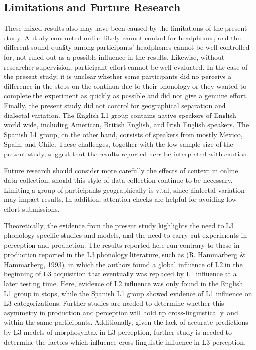 \documentclass[
  man]{apa6}
\begin{document}
\hypertarget{limitations-and-furture-research}{%
\subsection{Limitations and Furture Research}\label{limitations-and-furture-research}}

These mixed results also may have been caused by the limitations of the present study. A study conducted online likely cannot control for headphones, and the different sound quality among participants' headphones cannot be well controlled for, not ruled out as a possible influence in the results. Likewise, without researcher supervision, participant effort cannot be well evaluated. In the case of the present study, it is unclear whether some participants did no perceive a difference in the steps on the continua due to their phonology or they wanted to complete the experiment as quickly as possible and did not give a genuine effort. Finally, the present study did not control for geographical separation and dialectal variation. The English L1 group contains native speakers of English world wide, including American, British English, and Irish English speakers. The Spanish L1 group, on the other hand, consists of speakers from mostly Mexico, Spain, and Chile. These challenges, together with the low sample size of the present study, suggest that the results reported here be interpreted with caution.

Future research should consider more carefully the effects of context in online data collection, should this style of data collection continue to be necessary. Limiting a group of participants geographically is vital, since dialectal variation may impact results. In addition, attention checks are helpful for avoiding low effort submissions.

Theoretically, the evidence from the present study highlights the need to L3 phonology specific studies and models, and the need to carry out experiments in perception and production. The results reported here run contrary to those in production reported in the L3 phonology literature, such as (B. Hammarberg \& Hammarberg, 1993), in which the authors found a global influence of L2 in the beginning of L3 acquisition that eventually was replaced by L1 influence at a later testing time.
Here, evidence of L2 influence was only found in the English L1 group in stops, while the Spanish L1 group showed evidence of L1 influence on L3 categorizations.
Further studies are needed to determine whether this asymmetry in production and perception will hold up cross-linguistically, and within the same participants.
Additionally, given the lack of accurate predictions by L3 models of morphosyntax in L3 perception, further study is needed to determine the factors which influence cross-linguistic influence in L3 perception.
\end{document}
